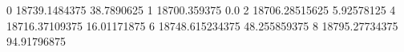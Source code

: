 0 18739.1484375 38.7890625
1 18700.359375 0.0
2 18706.28515625 5.92578125
4 18716.37109375 16.01171875
6 18748.615234375 48.255859375
8 18795.27734375 94.91796875
